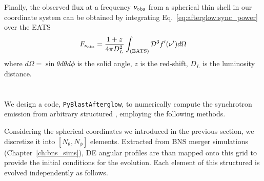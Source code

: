 Finally, the observed flux at a frequency $\nu_{\rm obs}$ from a spherical thin shell
in our coordinate system can be obtained by integrating 
Eq.~\eqref{eq:afterglow:sync_power} over the \ac{EATS} 
\begin{equation}
    F_{\nu_{\rm obs}} = \frac{1+z}{4\pi D_L^2} \int_{\rm (EATS)} \mathcal{D}^3 f'(\nu') d\Omega
    \label{eq:afterglow:sync_power_obs}
\end{equation}
where $d\Omega = \sin\theta d\theta d\phi$ is the solid angle, $z$ is the red-shift, 
$D_L$ is the luminosity distance. 



\section{\pyblast{}}\label{sec:afterglow:code}

\def\eq{\text{equation}}
\def\eqs{\text{equations}}


We design a code, \texttt{PyBlastAfterglow}, to numerically compute 
the synchrotron emission from arbitrary structured \blast{}, employing 
the following methods.

Considering the spherical coordinates we introduced in the previous section, 
we discretize it into $[N_{\theta},N_{\phi}]$ elements.
%
Extracted from \ac{BNS} merger simulations (Chapter~\ref{ch:bns_sims}), 
\ac{DE} angular profiles are than mapped onto this grid to provide the 
initial conditions for the evolution. 
%
Each element of this structured \blast{} is evolved independently 
as follows. 

